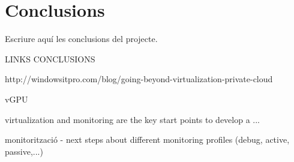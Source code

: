 \cleardoublepage
{}
\chapter*{Conclusions}

Escriure aquí les conclusions del projecte. 

LINKS CONCLUSIONS

http://windowsitpro.com/blog/going-beyond-virtualization-private-cloud

vGPU

virtualization and monitoring are the key start points to develop a ...

monitorització - next steps about different monitoring profiles (debug, active, passive,...)